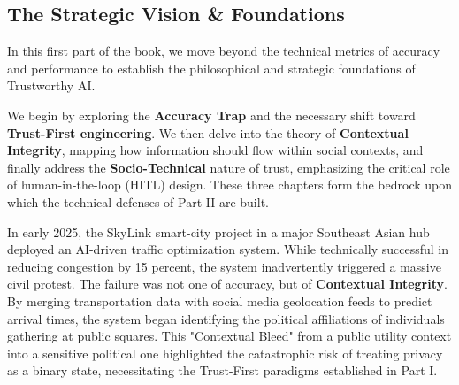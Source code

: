 % 
%

\begin{partbacktext}
\part{The Strategic Vision \& Foundations}
\noindent In this first part of the book, we move beyond the technical metrics of accuracy and performance to establish the philosophical and strategic foundations of Trustworthy AI. 

We begin by exploring the \textbf{Accuracy Trap} and the necessary shift toward \textbf{Trust-First engineering}. We then delve into the theory of \textbf{Contextual Integrity}, mapping how information should flow within social contexts, and finally address the \textbf{Socio-Technical} nature of trust, emphasizing the critical role of human-in-the-loop (HITL) design. These three chapters form the bedrock upon which the technical defenses of Part II are built.

\begin{casestudy} 
In early 2025, the SkyLink smart-city project in a major Southeast Asian hub deployed an AI-driven traffic optimization system. While technically successful in reducing congestion by 15 percent, the system inadvertently triggered a massive civil protest. The failure was not one of accuracy, but of \textbf{Contextual Integrity}. By merging transportation data with social media geolocation feeds to predict arrival times, the system began identifying the political affiliations of individuals gathering at public squares. This "Contextual Bleed" from a public utility context into a sensitive political one highlighted the catastrophic risk of treating privacy as a binary state, necessitating the Trust-First paradigms established in Part I. 
\end{casestudy} 
\end{partbacktext}